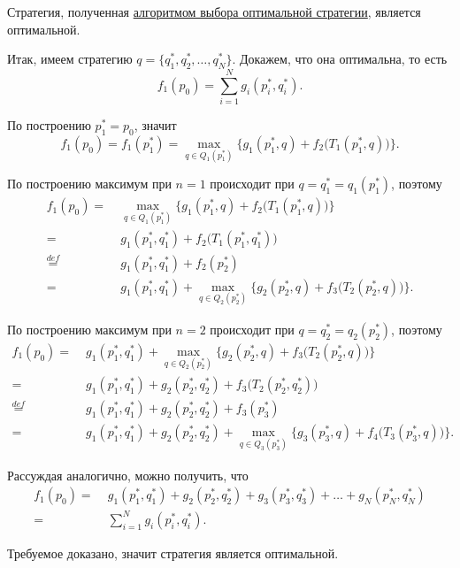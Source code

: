 \fact

Стратегия, полученная \hyperref[alg:opt_strategy]{алгоритмом выбора оптимальной стратегии}, является оптимальной.

\prooof


Итак, имеем стратегию $q = \{q_1^*, q_2^*, \dots, q_N^*\}$. Докажем, что она оптимальна, то есть
\[
f_1(p_0) = \sum_{i=1}^N g_i(p_i^*, q_i^*).
\]

По построению $p_1^* = p_0$, значит
\[
f_1(p_0) = f_1(p_1^*) = \max_{q \in Q_{1}(p_1^*)} \Big\{g_1(p_1^*, q) + f_{2}\big(T_{1}(p_1^*, q)\big)\Big\}.
\]

По построению максимум при $n=1$ происходит при $q = q_1^* = q_1(p_1^*)$, поэтому
\begin{align*}
	f_1(p_0) =& \; \max_{q \in Q_{1}(p_1^*)} \Big\{g_1(p_1^*, q) + f_{2}\big(T_{1}(p_1^*, q)\big)\Big\} \\
	=& \; g_1(p_1^*, q_1^*) + f_{2}\big(T_{1}(p_1^*, q_1^*)\big) \\
	\stackrel{def}{=}& \; g_1(p_1^*, q_1^*) + f_2(p_2^*) \\
	=& \; g_1(p_1^*, q_1^*) + \max_{q \in Q_{2}(p_2^*)} \Big\{g_2(p_2^*, q) + f_{3}\big(T_{2}(p_2^*, q)\big)\Big\}.
\end{align*}

По построению максимум при $n=2$ происходит при $q = q_2^* = q_2(p_2^*)$, поэтому
\begin{align*}
	f_1(p_0) =& \; g_1(p_1^*, q_1^*) + \max_{q \in Q_{2}(p_2^*)} \Big\{g_2(p_2^*, q) + f_{3}\big(T_{2}(p_2^*, q)\big)\Big\} \\
	=& \; g_1(p_1^*, q_1^*) + g_2(p_2^*, q_2^*) + f_{3}\big(T_{2}(p_2^*, q_2^*)\big) \\
	\stackrel{def}{=}& \; g_1(p_1^*, q_1^*) + g_2(p_2^*, q_2^*) + f_3(p_3^*) \\
	=& \; g_1(p_1^*, q_1^*) + g_2(p_2^*, q_2^*) + \max_{q \in Q_{3}(p_3^*)} \Big\{g_3(p_3^*, q) + f_{4}\big(T_{3}(p_3^*, q)\big)\Big\}.
\end{align*}

Рассуждая аналогично, можно получить, что
\begin{align*}
	f_1(p_0) =& \; g_1(p_1^*, q_1^*) + g_2(p_2^*, q_2^*) + g_3(p_3^*, q_3^*) + \dots + g_N(p_N^*, q_N^*) \\
	=& \; \sum_{i=1}^N g_i(p_i^*, q_i^*).
\end{align*}

Требуемое доказано, значит стратегия является оптимальной.

\remark

